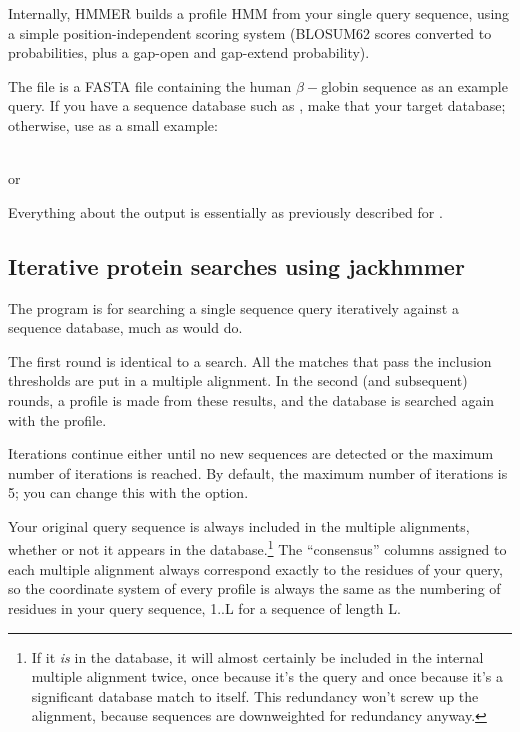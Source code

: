 Internally, HMMER builds a profile HMM from your single query
sequence, using a simple position-independent scoring system (BLOSUM62
scores converted to probabilities, plus a gap-open and gap-extend
probability).

The file  is a FASTA file containing the
human $\beta-$globin sequence as an example query. If you have a
sequence database such as , make that your
target database; otherwise, use  as a
small example:

\\
or\\

Everything about the output is essentially as previously described for
. 


\subsection{Iterative protein searches using jackhmmer}

The  program is for searching a single sequence query
iteratively against a sequence database, much as 
would do. 

The first round is identical to a  search. All the
matches that pass the inclusion thresholds are put in a multiple
alignment. In the second (and subsequent) rounds, a profile is made
from these results, and the database is searched again with the
profile.

Iterations continue either until no new sequences are detected or the
maximum number of iterations is reached. By default, the maximum
number of iterations is 5; you can change this with the 
option.

Your original query sequence is always included in the multiple
alignments, whether or not it appears in the database.\footnote{If it
  \emph{is} in the database, it will almost certainly be included in
  the internal multiple alignment twice, once because it's the query
  and once because it's a significant database match to itself. This
  redundancy won't screw up the alignment, because sequences are
  downweighted for redundancy anyway.}  
The ``consensus'' columns assigned to each multiple alignment always
correspond exactly to the residues of your query, so the coordinate
system of every profile is always the same as the numbering of
residues in your query sequence, 1..L for a sequence of length L.

